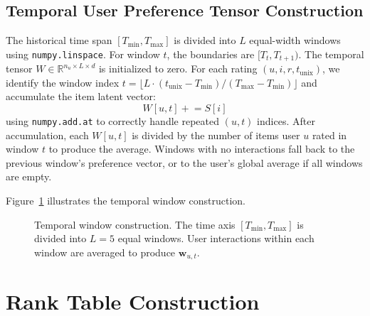 \subsection{Temporal User Preference Tensor Construction}

The historical time span $[T_{\min}, T_{\max}]$ is divided into $L$ equal-width windows using \texttt{numpy.linspace}. For window $t$, the boundaries are $[T_t, T_{t+1})$. The temporal tensor $W \in \mathbb{R}^{n_u \times L \times d}$ is initialized to zero. For each rating $(u, i, r, t_{\text{unix}})$, we identify the window index $t = \lfloor L \cdot (t_{\text{unix}} - T_{\min}) / (T_{\max} - T_{\min}) \rfloor$ and accumulate the item latent vector:
\[
  W[u, t] \mathrel{+}= S[i]
\]
using \texttt{numpy.add.at} to correctly handle repeated $(u, t)$ indices. After accumulation, each $W[u, t]$ is divided by the number of items user $u$ rated in window $t$ to produce the average. Windows with no interactions fall back to the previous window's preference vector, or to the user's global average if all windows are empty.

Figure~\ref{fig:windows} illustrates the temporal window construction.

\begin{figure}[htbp]
\centering
{}
\caption{Temporal window construction. The time axis $[T_{\min}, T_{\max}]$ is divided into $L=5$ equal windows. User interactions within each window are averaged to produce $\mathbf{w}_{u,t}$.}
\label{fig:windows}
\end{figure}

\section{Rank Table Construction}

